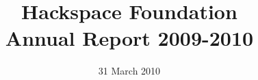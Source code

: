 \documentclass[a4paper]{report}
\begin{document}
\title{Hackspace Foundation\\Annual Report 2009-2010}
\date{31 March 2010}
\maketitle





\end{document}
